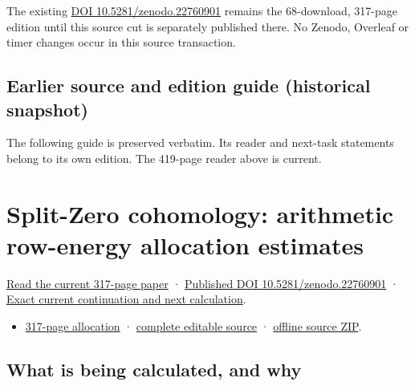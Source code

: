 \documentclass[
]{article}
\providecommand{\tightlist}{%
  \setlength{\itemsep}{0pt}\setlength{\parskip}{0pt}}
\begin{document}
The existing \href{https://doi.org/10.5281/zenodo.22760901}{DOI
10.5281/zenodo.22760901} remains the 68-download, 317-page edition until
this source cut is separately published there. No Zenodo, Overleaf or
timer changes occur in this source transaction.

\subsection{Earlier source and edition guide (historical
snapshot)}\label{earlier-source-and-edition-guide-historical-snapshot-2}

The following guide is preserved verbatim. Its reader and next-task
statements belong to its own edition. The 419-page reader above is
current.

\section{Split-Zero cohomology: arithmetic row-energy allocation
estimates}\label{split-zero-cohomology-arithmetic-row-energy-allocation-estimates}

\href{https://zenodo.org/api/records/22760901/files/67-allocation-reader.pdf/content}{Read
the current 317-page paper} ·
\href{https://doi.org/10.5281/zenodo.22760901}{Published DOI
10.5281/zenodo.22760901} ·
\href{https://github.com/KokunoYumeto/zeta-function-research-reader/blob/88cec321ccb455d1906d4abce7dc08bea6c7676d/workbenches/splitzero-tandem/continuations/20260915-allocation-continuation/00_CONTINUE_HERE.md}{Exact
current continuation and next calculation}.

\begin{itemize}
\tightlist
\item
  \href{https://zenodo.org/api/records/22760901/files/67-allocation-reader.pdf/content}{317-page
  allocation} ·
  \href{https://github.com/KokunoYumeto/zeta-function-research-reader/tree/88cec321ccb455d1906d4abce7dc08bea6c7676d/workbenches/splitzero-tandem/continuations/20260915-allocation-continuation}{complete
  editable source} ·
  \href{https://zenodo.org/api/records/22760901/files/68-allocation-sources.zip/content}{offline
  source ZIP}.
\end{itemize}

\subsection{What is being calculated, and
why}\label{what-is-being-calculated-and-why}
\end{document}
